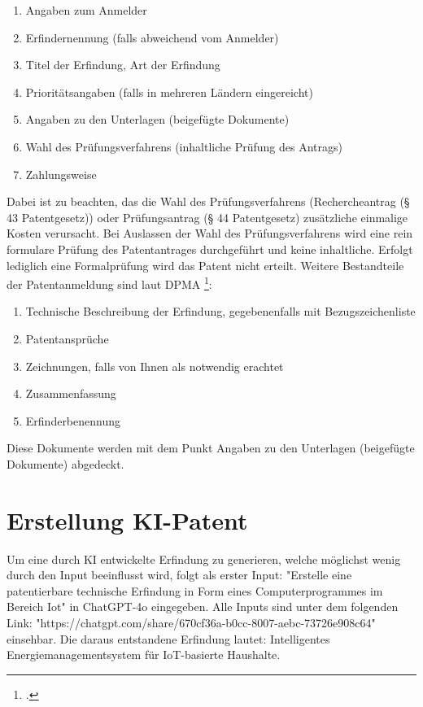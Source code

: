 \begin{enumerate}
    \item Angaben zum Anmelder
    \item Erfindernennung (falls abweichend vom Anmelder)
    \item Titel der Erfindung, Art der Erfindung
    \item Prioritätsangaben (falls in mehreren Ländern eingereicht)
    \item Angaben zu den Unterlagen (beigefügte Dokumente)
    \item Wahl des Prüfungsverfahrens (inhaltliche Prüfung des Antrags)
	\item Zahlungsweise
\end{enumerate}

Dabei ist zu beachten, das die Wahl des Prüfungsverfahrens 
(Rechercheantrag (§ 43 Patentgesetz)) oder
Prüfungsantrag (§ 44 Patentgesetz) zusätzliche einmalige Kosten verursacht.
Bei Auslassen der Wahl des Prüfungsverfahrens wird eine rein formulare
Prüfung des Patentantrages durchgeführt und keine inhaltliche.
Erfolgt lediglich eine Formalprüfung wird das Patent nicht erteilt.
Weitere Bestandteile der Patentanmeldung sind laut DPMA \footcite{DPMAAnmeldung}:

\begin{enumerate}
	\item Technische Beschreibung der Erfindung, gegebenenfalls mit Bezugszeichenliste
	\item Patentansprüche
	\item Zeichnungen, falls von Ihnen als notwendig erachtet
	\item Zusammenfassung
	\item Erfinderbenennung
\end{enumerate}

Diese Dokumente werden mit dem Punkt Angaben 
zu den Unterlagen (beigefügte Dokumente) abgedeckt.

\section{Erstellung KI-Patent}

Um eine durch KI entwickelte Erfindung zu generieren, 
welche möglichst wenig durch den Input beeinflusst wird, 
folgt als erster Input:
"Erstelle eine patentierbare technische Erfindung 
in Form eines Computerprogrammes im Bereich Iot" 
in ChatGPT-4o eingegeben.
Alle Inputs sind unter dem folgenden Link:
"https://chatgpt.com/share/670cf36a-b0cc-8007-aebc-73726e908c64"
einsehbar.
Die daraus entstandene Erfindung lautet:
Intelligentes Energiemanagementsystem für \gls{IoT}-basierte Haushalte.


